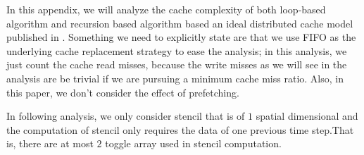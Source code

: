 
In this appendix, we will analyze the cache complexity of both loop-based algorithm and recursion based
algorithm based an ideal distributed cache model published in \cite{FrigoSt09}. Something we need to
explicitly state are that we use FIFO as the underlying cache replacement strategy to ease the analysis;
in this analysis, we just count the cache read misses, because the write misses as we will see in the analysis
are be trivial if we are pursuing a minimum cache miss ratio. Also, in this paper, we don't consider the effect
of prefetching.

In following analysis, we only consider stencil that is of $1$ spatial dimensional and the computation of stencil
only requires the data of one previous time step.That is, there are at most $2$ toggle array used in stencil computation.

%

